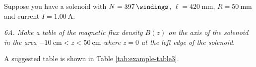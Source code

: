 \documentclass[../Elmag-labhefte-2020.tex]{subfiles}
\begin{document}
Suppose you have a solenoid with $N = \SI{397}{\windings}$, $\ell = \SI{420}{\mm}$, $R = \SI{50}{\mm}$ and current $I = \SI{1.00}{\ampere}$.

\emph{ 6A. Make a table of the magnetic flux density $B(z)$ on the axis of the solenoid in the area $\SI{-10}{\cm} < z < \SI{50}{\cm}$ where $z = 0$ at the left edge of the solenoid.} %


A suggested table is shown in Table \ref{tab:example-table3}.
\end{document}

